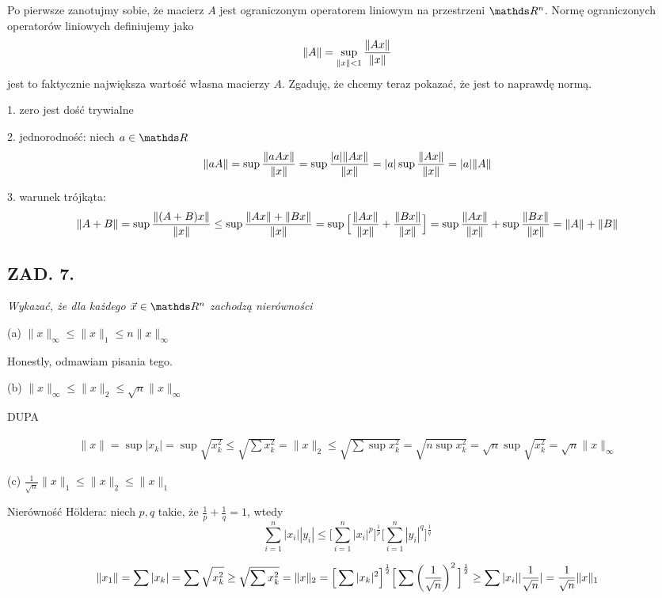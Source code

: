 \documentclass{article}[16pt]
\begin{document}
\medskip

Po pierwsze zanotujmy sobie, że macierz $A$ jest ograniczonym operatorem liniowym na przestrzeni $\R^n$. Normę ograniczonych operatorów liniowych definiujemy jako
$$\|A\|=\sup_{\|x\|<1}{\|Ax\|\over \|x\|}$$
jest to faktycznie największa wartość własna macierzy $A$. Zgaduję, że chcemy teraz pokazać, że jest to naprawdę normą.
\smallskip

1. zero jest dość trywialne
\smallskip

2. jednorodność: niech $a\in\R$
\begin{align*}
    \|aA\|=\sup{\|aAx\|\over \|x\|}=\sup{|a|\|Ax\|\over \|x\|}=|a|\sup{\|Ax\|\over\|x\|}=|a|\|A\|
\end{align*}

3. warunek trójkąta:
\begin{align*}
    \|A+B\|=\sup{\|(A+B)x\|\over\|x\|}\leq \sup{\|Ax\|+\|Bx\|\over\|x\|}=\sup\Big[{\|Ax\|\over\|x\|}+{\|Bx\|\over \|x\|}\Big]=\sup{\|Ax\|\over\|x\|}+\sup{\|Bx\|\over\|x\|}=\|A\|+\|B\|
\end{align*}

\subsection*{ZAD. 7.}
\emph{Wykazać, że dla każdego $\vec x\in\R^n$ zachodzą nierówności}
\medskip

{\color{acc}(a) $\|x\|_\infty\leq\|x\|_1\leq n\|x\|_\infty$}
\smallskip

Honestly, odmawiam pisania tego.
\medskip

{\color{acc}(b) $\|x\|_\infty\leq\|x\|_2\leq\sqrt{n}\|x\|_\infty$}
\smallskip

DUPA

\begin{align*}
    \|x\|=\sup|x_k|=\sup\sqrt{x_k^2}\leq \sqrt{\sum x_k^2}=\|x\|_2\leq \sqrt{\sum\sup x_k^2}=\sqrt{n\sup x_k^2}=\sqrt{n}\sup\sqrt{x_k^2}=\sqrt{n}\|x\|_\infty
\end{align*}

{\color{acc}(c) $\frac1{\sqrt{n}}\|x\|_1\leq\|x\|_2\leq\|x\|_1$}

Nierówność H\"oldera: niech $p,q$ takie, że $\frac1p+\frac1q=1$, wtedy
$$\sum\limits_{i=1}^n|x_i||y_i|\leq\Big[\sum\limits_{i=1}^n|x_i|^p\Big]^\frac1p\Big[\sum\limits_{i=1}^n|y_i|^q\Big]^\frac1q$$

\begin{align*}
    \|x_1\|=\sum|x_k|=\sum\sqrt{x_k^2}\geq\sqrt{\sum x_k^2}=\|x\|_2=\Big[\sum|x_k|^2\Big]^\frac12\Big[\sum\left({1\over\sqrt n}\right)^2\Big]^\frac12\geq\sum|x_i||\frac1{\sqrt{n}}|=\frac1{\sqrt{n}}\|x\|_1
\end{align*}
\end{document}
